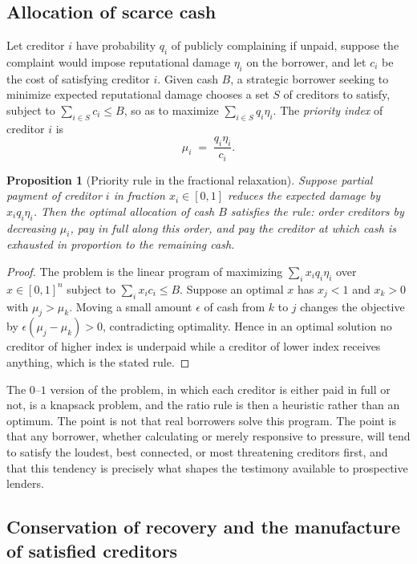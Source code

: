 \documentclass[11pt]{article}
\newtheorem{proposition}[theorem]{Proposition}
\theoremstyle{definition}
\theoremstyle{remark}
\begin{document}
\subsection{Allocation of scarce cash}

Let creditor $i$ have probability $q_i$ of publicly complaining if unpaid, suppose the complaint would impose reputational damage $\eta_i$ on the borrower, and let $c_i$ be the cost of satisfying creditor $i$. Given cash $B$, a strategic borrower seeking to minimize expected reputational damage chooses a set $S$ of creditors to satisfy, subject to $\sum_{i\in S}c_i\le B$, so as to maximize $\sum_{i\in S}q_i\eta_i$. The \emph{priority index} of creditor $i$ is
\[
\mu_i \;=\; \frac{q_i \eta_i}{c_i}.
\]

\begin{proposition}[Priority rule in the fractional relaxation]\label{prop:priority}
Suppose partial payment of creditor $i$ in fraction $x_i\in[0,1]$ reduces the expected damage by $x_iq_i\eta_i$. Then the optimal allocation of cash $B$ satisfies the rule: order creditors by decreasing $\mu_i$, pay in full along this order, and pay the creditor at which cash is exhausted in proportion to the remaining cash.
\end{proposition}

\begin{proof}
The problem is the linear program of maximizing $\sum_i x_iq_i\eta_i$ over $x\in[0,1]^n$ subject to $\sum_i x_ic_i\le B$. Suppose an optimal $x$ has $x_j<1$ and $x_k>0$ with $\mu_j>\mu_k$. Moving a small amount $\epsilon$ of cash from $k$ to $j$ changes the objective by $\epsilon(\mu_j-\mu_k)>0$, contradicting optimality. Hence in an optimal solution no creditor of higher index is underpaid while a creditor of lower index receives anything, which is the stated rule.
\end{proof}

The $0$--$1$ version of the problem, in which each creditor is either paid in full or not, is a knapsack problem, and the ratio rule is then a heuristic rather than an optimum. The point is not that real borrowers solve this program. The point is that any borrower, whether calculating or merely responsive to pressure, will tend to satisfy the loudest, best connected, or most threatening creditors first, and that this tendency is precisely what shapes the testimony available to prospective lenders.

\subsection{Conservation of recovery and the manufacture of satisfied creditors}
\end{document}
